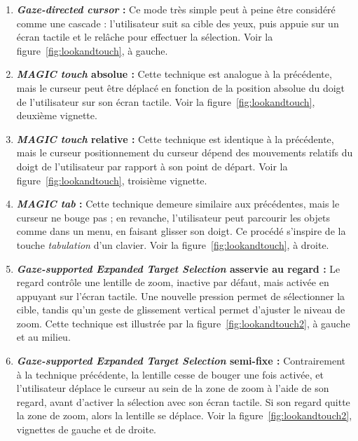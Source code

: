 	\begin{enumerate}
		\item \textbf{\emph{Gaze-directed cursor} :} Ce mode très simple peut à peine être considéré comme une cascade : l'utilisateur suit sa cible des yeux, puis appuie sur un écran tactile et le relâche pour effectuer la sélection. Voir la figure~\ref{fig:lookandtouch}, à gauche.
		\item \textbf{\emph{MAGIC touch} absolue :} Cette technique est analogue à la précédente, mais le curseur peut être déplacé en fonction de la position absolue du doigt de l'utilisateur sur son écran tactile. Voir la figure~\ref{fig:lookandtouch}, deuxième vignette.
		\item \textbf{\emph{MAGIC touch} relative :} Cette technique est identique à la précédente, mais le curseur positionnement du curseur dépend des mouvements relatifs du doigt de l'utilisateur par rapport à son point de départ. Voir la figure~\ref{fig:lookandtouch}, troisième vignette.
		\item \textbf{\emph{MAGIC tab} :} Cette technique demeure similaire aux précédentes, mais le curseur ne bouge pas ; en revanche, l'utilisateur peut parcourir les objets comme dans un menu, en faisant glisser son doigt. Ce procédé s'inspire de la touche \emph{tabulation} d'un clavier. Voir la figure~\ref{fig:lookandtouch}, à droite.
		\item \textbf{\emph{Gaze-supported Expanded Target Selection} asservie au regard :} Le regard contrôle une lentille de zoom, inactive par défaut, mais activée en appuyant sur l'écran tactile. Une nouvelle pression permet de sélectionner la cible, tandis qu'un geste de glissement vertical permet d'ajuster le niveau de zoom. Cette technique est illustrée par la figure~\ref{fig:lookandtouch2}, à gauche et au milieu.
		\item \textbf{\emph{Gaze-supported Expanded Target Selection} semi-fixe :} Contrairement à la technique précédente, la lentille cesse de bouger une fois activée, et l'utilisateur déplace le curseur au sein de la zone de zoom à l'aide de son regard, avant d'activer la sélection avec son écran tactile. Si son regard quitte la zone de zoom, alors la lentille se déplace. Voir la figure~\ref{fig:lookandtouch2}, vignettes de gauche et de droite.
	\end{enumerate}
	
